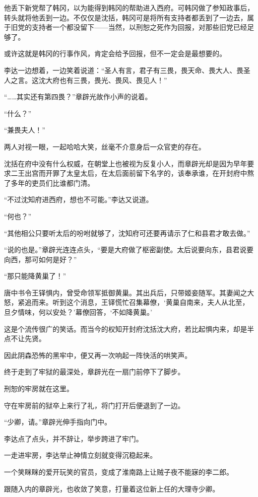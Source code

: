 他丢下新党帮了韩冈，以为能得到韩冈的帮助进入西府。可韩冈做了参知政事后，转头就将他丢到一边。不仅仅是沈括，韩冈可是将所有支持者都丢到了一边去，属于旧党的支持者一个都没留下——当然，以刑恕之死作为回报，对那些旧党已经足够了。

或许这就是韩冈的行事作风，肯定会给予回报，但不一定会是最想要的。

李达一边想着，一边笑着说道：“圣人有言，君子有三畏，畏天命、畏大人、畏圣人之言。这沈大府也有三畏，畏光、畏风、畏见人！”

“……其实还有第四畏？”章辟光故作小声的说着。

“什么？”

“兼畏夫人！”

两人对视一眼，一起哈哈大笑，丝毫不介意身后一众官吏的存在。

沈括在府中没有什么权威，在朝堂上也被视为反复小人，而章辟光却是因为早年要求二王出宫而开罪了太皇太后，在太后面前留下名字的，该奉承谁，在开封府中熬了多年的吏员们比谁都门清。

“不过沈知府进西府，想也不可能。”李达又说道。

“何也？”

“其他相公只要听太后的吩咐就够了，沈知府可还要再请示了仁和县君才敢去做。”

“说的也是。”章辟光连连点头，“要是大府做了枢密副使。太后说要向东，县君说要向西，那可如何是好？”

“那只能降黄巢了！”

唐中书令王铎惧内，曾受命领军抵御黄巢。其出兵后，只带姬妾随军。其妻闻之大怒，紧追而来。听到这个消息，王铎慌忙召集幕僚，‘黄巢自南来，夫人从北至，旦夕情味，何以安处？’幕僚回答，‘不如降黄巢。’

这是个流传很广的笑话。而当今的权知开封府沈括沈大府，若比起惧内来，却是半点不让先贤。

因此阴森恐怖的黑牢中，便又再一次响起一阵快活的哄笑声。

终于走到了牢狱的最深处，章辟光在一扇门前停下了脚步。

刑恕的牢房就在这里。

守在牢房前的狱卒上来行了礼，将门打开后便退到了一边。

“少卿，请。”章辟光伸手指向门中。

李达点了点头，并不辞让，举步跨进了牢门。

一走进牢房，李达举止神情立刻就变得沉稳起来。

一个笑眯眯的爱开玩笑的官员，变成了淮南路上让贼子夜不能寐的李二郎。

跟随入内的章辟光，也收敛了笑意，打量着这位新上任的大理寺少卿。

